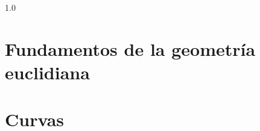 \documentclass[10pt, twoside]{book}
\begin{document}




\pagestyle{fancy}

\fancyhf{}
\fancyhead[LE]{\nouppercase{\leftmark\hfill\S\thesection}}
\fancyhead[RO]{\nouppercase{\S\thesection\hfill\rightmark}}
\fancyfoot[RO]{\thepage}
\fancyfoot[LE]{\thepage}

\pagecolor{white}

\frontmatter
\setcounter{tocdepth}{1}
\tableofcontents
%
\printbibliography

\begin{spacing}{1.0}

\mainmatter
\chapter{Fundamentos de la geometría euclidiana}

\chapter{Curvas}


\appendix

\backmatter
    
\end{spacing}
	
\end{document}

